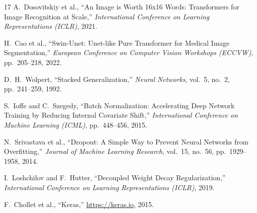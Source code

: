 \documentclass[10pt,letterpaper,twocolumn]{article}
\begin{document}
\begin{thebibliography}{17}
 A.~Dosovitskiy et al., ``An Image is Worth 16x16 Words:
Transformers for Image Recognition at Scale,'' \textit{International Conference on
Learning Representations (ICLR)}, 2021.

 H.~Cao et al., ``Swin-Unet: Unet-like Pure Transformer for Medical
Image Segmentation,'' \textit{European Conference on Computer Vision Workshops
(ECCVW)}, pp.~205--218, 2022.

 D.~H.~Wolpert, ``Stacked Generalization,'' \textit{Neural
Networks}, vol.~5, no.~2, pp.~241--259, 1992.

 S.~Ioffe and C.~Szegedy, ``Batch Normalization: Accelerating Deep
Network Training by Reducing Internal Covariate Shift,'' \textit{International
Conference on Machine Learning (ICML)}, pp.~448--456, 2015.

 N.~Srivastava et al., ``Dropout: A Simple Way to Prevent
Neural Networks from Overfitting,'' \textit{Journal of Machine Learning Research},
vol.~15, no.~56, pp.~1929--1958, 2014.

 I.~Loshchilov and F.~Hutter, ``Decoupled Weight Decay
Regularization,'' \textit{International Conference on Learning Representations
(ICLR)}, 2019.

 F.~Chollet et al., ``Keras,'' \url{https://keras.io}, 2015.
\end{thebibliography}
\end{document}
